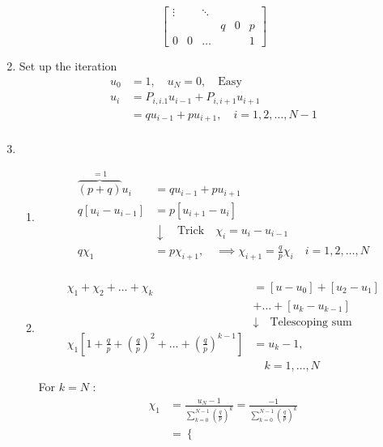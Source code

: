 \documentclass{article}
\theoremstyle{remark}
\begin{document}
\begin{enumerate}
\[\begin{bmatrix}
     \vdots   &  &   \ddots    \\
      &  &  & q  & 0  &  p \\
     0  &  0  &  \ldots  &   &  & 1
     \end{bmatrix}
     \]
   \item Set up the iteration \[
   \begin{split}
     u _{0}  & = 1 , \quad  u_{N} = 0 , \quad  \text{Easy}   \\
     u_{i} &=  P_{i, i.1} u_{i-1} + P _{i,i+1} u_{i+1}  \\
     &= q u_{i-1} + p u_{i+1} , \quad i=1,2, \ldots, N-1  \\
   \end{split}
   \]
 \item
   \begin{enumerate}
     \item  \[
         \begin{split}
           \overbrace{(p + q)}^{ = 1} u_{i}   & = q u_{i -1} + p u_{i+1} \\
    q\left[ u _{ i} - u_{i-1} \right] &=  p \left[ u_{i+1} - u_{i} \right] \\
      &  \downarrow \quad \text{Trick}    \quad \chi _{i} = u_{i} - u_{i-1}   \\
    q \chi _{1} &=  p \chi _{i+1} , \quad  \implies  \chi _{i+1} = \frac{q}{p}  \chi _{i}  \quad  i = 1,2 , \ldots , N  \\
         \end{split}
     \]
   \item \[
   \begin{split}
     \chi _{1} + \chi _{2} + \ldots + \chi _{k} &= \left[ u - u_{0} \right] + \left[ u_{2} - u_{1} \right] \\
      & + \ldots + \left[ u_{k} - u_{k-1} \right] \\
       &  \downarrow  \quad \text{Telescoping sum}  \\
        \chi _{1}\left[ 1 + \frac{q}{p} + \left( \frac{q}{p} \right)^2 + \ldots + \left( \frac{q}{p} \right)^{k-1}  \right]&=  u_{k} -1, \\
        &  \quad k = 1,\ldots,N  \\
   \end{split}
   \]
   For $k = N$ : \[
   \begin{split}
     \chi _{1} &=    \frac{u_{N} -1}{\sum_{k=0}^{N-1} \left( \frac{q}{p} \right)^{k}}  = \frac{-1}{ \sum_{k = 0}^{N-1}  \left( \frac{q}{p} \right)^{k}}   \\
     &= \begin{cases}

\end{cases}
\end{split}\]
\end{enumerate}
\end{enumerate}
\end{document}
